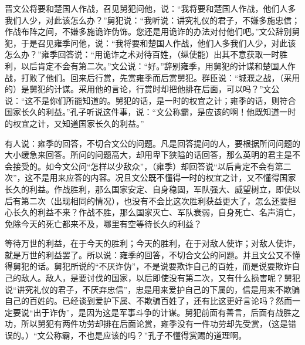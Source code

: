 \documentclass[11pt,a4paper]{ctexart}
\begin{document}

\par\vspace{0.5em}

\begin{translation}
晋文公将要和楚国人作战，召见舅犯问他，说：“我将要和楚国人作战，他们人多我们人少，对此该怎么办？”舅犯说：“我听说：讲究礼仪的君子，不嫌多施忠信；作战布阵之间，不嫌多施诡诈伪饰。您还是用诡诈的办法对付他们吧。”文公辞别舅犯，于是召见雍季问他，说：“我将要和楚国人作战，他们人多我们人少，对此该怎么办？”雍季回答说：“用诡诈之术对待百姓，（纵使能）出其不意获取一时胜利，以后肯定不会有第二次。”文公说：“好。”辞别雍季，用舅犯的计谋和楚国人作战，打败了他们。回来后行赏，先赏雍季而后赏舅犯。群臣说：“城濮之战，（采用的）是舅犯的计谋。采用他的言论，行赏时却把他排在后面，可以吗？”文公说：“这不是你们所能知道的。舅犯的话，是一时的权宜之计；雍季的话，则符合国家长久的利益。”孔子听说这件事，说：“文公称霸，是应该的啊！他既知道一时的权宜之计，又知道国家长久的利益。”

有人说：雍季的回答，不切合文公的问题。凡是回答提问的人，要根据所问问题的大小缓急来回答。所问的问题高大，却用卑下狭隘的话回答，那么英明的君主是不会接受的。如今文公问“怎样以少敌众”，（雍季）却回答说“以后肯定不会有第二次”，这不是用来应答的内容。况且文公既不懂得一时的权宜之计，又不懂得国家长久的利益。作战胜利，那么国家安定、自身稳固，军队强大、威望树立，即使以后有第二次（出现相同的情况），也没有不会比这次胜利获益更大了，怎么还要担心长久的利益不来？作战不胜，那么国家灭亡、军队衰弱，自身死亡、名声消亡，免除今天的死亡都来不及，哪里有空等待长久的利益？

等待万世的利益，在于今天的胜利；今天的胜利，在于对敌人使诈；对敌人使诈，就是万世的利益罢了。所以说：雍季的回答，不切合文公的问题。并且文公又不懂得舅犯的话。舅犯所说的“不厌诈伪”，不是说要欺诈自己的百姓，而是说要欺诈自己的敌人。敌人，是要讨伐的国家，以后即使没有第二次，又有什么损害呢？舅犯说“讲究礼仪的君子，不厌弃忠信”，忠是用来爱护自己的下属的，信是用来不欺骗自己的百姓的。已经谈到爱护下属、不欺骗百姓了，还有比这更好言论吗？然而一定要说“出于诈伪”，是因为这是军事斗争的计谋。舅犯前面有善言，后面有战胜之功，所以舅犯有两件功劳却排在后面论赏，雍季没有一件功劳却先受赏，（这是错误的。）“文公称霸，不也是应该的吗？”孔子不懂得赏赐的道理啊。
\end{translation}
\end{document}

